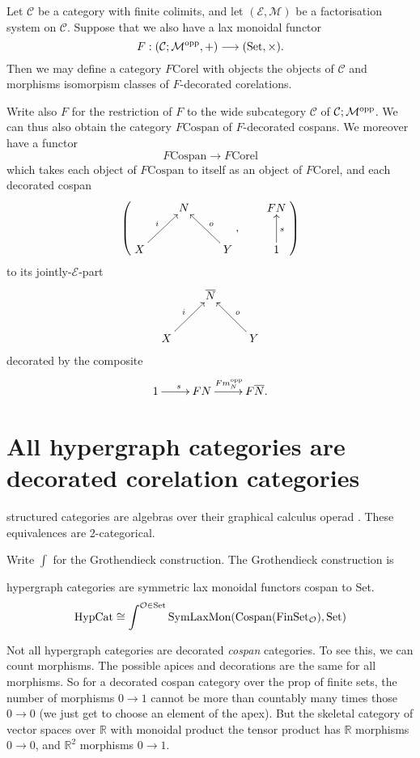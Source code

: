 \begin{corollary}
  Let $\mathcal C$ be a category with finite colimits, and let $(\mathcal E,
  \mathcal M)$ be a factorisation system on $\mathcal C$. Suppose that we also
  have a lax monoidal functor
  \[
    F: (\mathcal C;\mathcal M^{\mathrm{opp}},+) \longrightarrow (\mathrm{Set}, \times).
  \]
  Then we may define a category $F\mathrm{Corel}$ with objects the objects of
  $\mathcal C$ and morphisms isomorpism classes of $F$-decorated corelations.

  Write also $F$ for the restriction of $F$ to the wide subcategory $\mathcal
  C$ of $\mathcal C;\mathcal M^{\mathrm{opp}}$. We can thus also obtain the category
  $F\mathrm{Cospan}$ of
  $F$-decorated cospans. We moreover have a functor 
  \[
    F\mathrm{Cospan} \to F\mathrm{Corel}
  \]
  which takes each object of $F\mathrm{Cospan}$ to itself as an object of
  $F\mathrm{Corel}$, and each decorated cospan
  \[
    \left(
    \begin{aligned}
      \xymatrix{
	& N \\  
	X \ar[ur]^{i} && Y \ar[ul]_{o}
      }
    \end{aligned}
    ,
    \qquad
    \begin{aligned}
      \xymatrix{
	FN \\
	1 \ar[u]_{s}
      }
    \end{aligned}
    \right)
  \]  
  to its jointly-$\mathcal E$-part
  \[
    \xymatrix{
      & \overline{N} \\  
      X \ar[ur]^{i} && Y \ar[ul]_{o}
    }
  \]
  decorated by the composite
  \[
    \xymatrix{
      1 \ar[r]^s & FN \ar[r]^{Fm_N^\opp} & F\overline{N}.
    }
  \]
\end{corollary}


\section{All hypergraph categories are decorated corelation categories}
structured categories are algebras over their graphical calculus operad
\cite{SSR}. These equivalences are 2-categorical.

Write $\int$ for the Grothendieck construction. The Grothendieck construction
is

\begin{theorem}
hypergraph categories are symmetric lax monoidal functors cospan to Set.
\[
  \mathrm{HypCat} \cong \int^{\mathcal O \in \mathrm{Set}}
  \mathrm{SymLaxMon}(\operatorname{{Cospan}}(\mathrm{FinSet}_{\mathcal O}), \mathrm{Set})
\]
\end{theorem}
\cite{SV}
\begin{remark}
Not all hypergraph categories are decorated \emph{cospan} categories. To see
this, we can count morphisms. The possible apices and decorations are the same
for all morphisms. So for a decorated cospan category over the prop of finite
sets, the number of morphisms $0 \to 1$ cannot be more than countably many times
those $0 \to 0$ (we just get to choose an element of the apex). But the skeletal
category of vector spaces over $\mathbb{R}$ with monoidal product the tensor
product has $\mathbb{R}$ morphisms $0 \to 0$, and $\mathbb{R}^2$ morphisms $0
\to 1$.
\end{remark}

